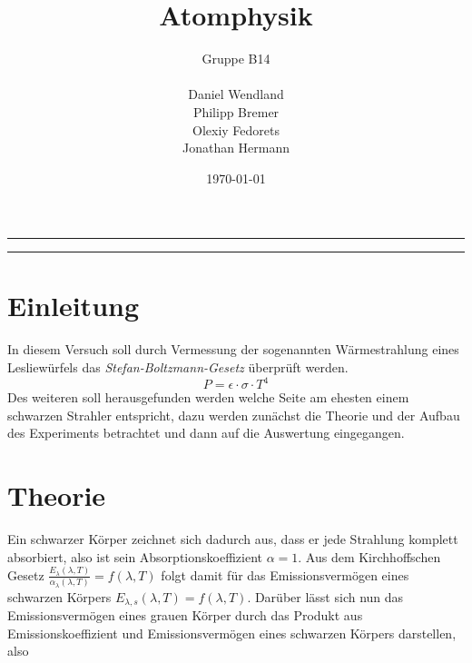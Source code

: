 \documentclass[a4paper, 11pt]{article}
\title{Atomphysik}
\author{Gruppe B14 \\ \\ Daniel Wendland \\ Philipp Bremer \\ Olexiy Fedorets \\ Jonathan Hermann}
\date{\today}
\begin{document}
\begin{titlepage}
\vspace*{\fill}
\begin{center}
	\vfill
	\newcommand{\Line}{\rule{\linewidth}{0.6mm}}
	\Line 
	{\let\newpage\relax\maketitle}
	\Line 
	\vfill
\end{center}
\vspace*{\fill}
\thispagestyle{empty}
\end{titlepage}





\newpage
\thispagestyle{empty}
\tableofcontents
\newpage

\pagestyle{fancy}
\fancyhf{}
\fancyhead[L]{\nouppercase{\leftmark}}
\fancyhead[R]{\thepage}
\renewcommand{\headrulewidth}{0.5pt}
\fancyfoot[C]{\thepage}


\setcounter{page}{1}
\section{Einleitung}
In diesem Versuch soll durch Vermessung der sogenannten Wärmestrahlung eines Lesliewürfels das \textit{Stefan-Boltzmann-Gesetz} überprüft werden.
\begin{equation} \label{eq:SBG}
P=\epsilon \cdot \sigma \cdot T^4
\end{equation}
Des weiteren soll herausgefunden werden welche Seite am ehesten einem schwarzen Strahler entspricht, dazu werden zunächst die Theorie und der Aufbau des Experiments betrachtet und dann auf die Auswertung eingegangen.


\section{Theorie}

Ein schwarzer Körper zeichnet sich dadurch aus, dass er jede Strahlung komplett absorbiert, also ist sein Absorptionskoeffizient $\alpha=1$. Aus dem Kirchhoffschen Gesetz $\frac{E_{\lambda}(\lambda,T)}{\alpha_{\lambda}(\lambda,T)}=f(\lambda,T)$ folgt damit für das Emissionsvermögen eines schwarzen Körpers $E_{\lambda,s}(\lambda,T)=f(\lambda,T)$. Darüber lässt sich nun das Emissionsvermögen eines grauen Körper durch das Produkt aus Emissionskoeffizient und Emissionsvermögen eines schwarzen Körpers darstellen, also
\end{document}
